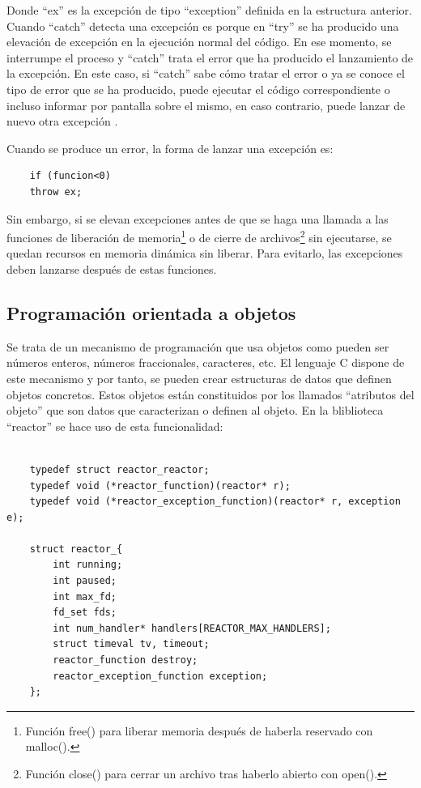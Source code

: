 Donde ``ex'' es la excepción de tipo ``exception'' definida en la estructura anterior. Cuando ``catch'' detecta una excepción es porque en ``try'' se ha producido una elevación de excepción en la ejecución normal del código. En ese momento, se interrumpe el proceso y ``catch'' trata el error que ha producido el lanzamiento de la excepción. En este caso, si ``catch'' sabe cómo tratar el error o ya se conoce el tipo de error que se ha producido, puede ejecutar el código correspondiente o incluso informar por pantalla sobre el mismo, en caso contrario, puede lanzar de nuevo otra excepción \citep{franciscoexcep}.

Cuando se produce un error, la forma de lanzar una excepción es:

    \begin{verbatim}
    if (funcion<0)
    throw ex;
    \end{verbatim}
Sin embargo, si se elevan excepciones antes de que se haga una llamada a las funciones de liberación de memoria\footnote{Función free() para liberar memoria después de haberla reservado con malloc().} o de cierre de archivos\footnote{Función close() para cerrar un archivo tras haberlo abierto con open().} sin ejecutarse, se quedan recursos en memoria dinámica sin liberar. Para evitarlo, las excepciones deben lanzarse después de estas funciones.

\subsection{Programación orientada a objetos} \label{s2_1_5}

Se trata de un mecanismo de programación que usa objetos como pueden ser números enteros, números fraccionales, caracteres, etc. El lenguaje C dispone de este mecanismo y por tanto, se pueden crear estructuras de datos que definen objetos concretos. Estos objetos están constituidos por los llamados ``atributos del objeto'' que son datos que caracterizan o definen al objeto. En la bliblioteca ``reactor'' se hace uso de esta funcionalidad: \\
    \begin{verbatim}
    
    typedef struct reactor_reactor;
    typedef void (*reactor_function)(reactor* r);
    typedef void (*reactor_exception_function)(reactor* r, exception e);
    
    struct reactor_{
        int running;
        int paused;
        int max_fd;
        fd_set fds;
        int num_handler* handlers[REACTOR_MAX_HANDLERS];
        struct timeval tv, timeout;
        reactor_function destroy;
        reactor_exception_function exception;
    };
    \end{verbatim}

